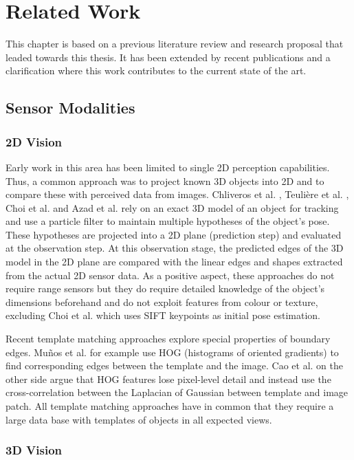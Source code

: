 \chapter{Related Work}

This chapter is based on a previous literature review and research proposal that leaded towards this thesis. It has been extended by recent publications and a clarification where this work contributes to the current state of the art.


\section{Sensor Modalities}

\subsection{2D Vision}
Early work in this area has been limited to single 2D perception capabilities. Thus, a common approach was to project known 3D objects into 2D and to compare these with perceived data from images. Chliveros et al. \cite{Chliveros2013}, Teuli\`ere et al. \cite{Teuliere2010}, Choi et al. \cite{Choi2012} and Azad et al. \cite{Azad2011} rely on an exact 3D model of an object for tracking and use a particle filter to maintain multiple hypotheses of the object's pose. These hypotheses are projected into a 2D plane (prediction step) and evaluated at the observation step. At this observation stage, the predicted edges of the 3D model in the 2D plane are compared with the linear edges and shapes extracted from the actual 2D sensor data. As a positive aspect, these approaches do not require range sensors but they do require detailed knowledge of the object's dimensions beforehand and do not exploit features from colour or texture, excluding Choi et al. which uses SIFT keypoints as initial pose estimation.

Recent template matching approaches explore special properties of boundary edges. Mu\~nos et al. \cite{Munoz2016} for example use HOG (histograms of oriented gradients) to find corresponding edges between the template and the image. Cao et al. \cite{Cao2016} on the other side argue that HOG features lose pixel-level detail and instead use the cross-correlation between the Laplacian of Gaussian between template and image patch. All template matching approaches have in common that they require a large data base with templates of objects in all expected views.

\subsection{3D Vision}
\label{sec:3d_vision}

